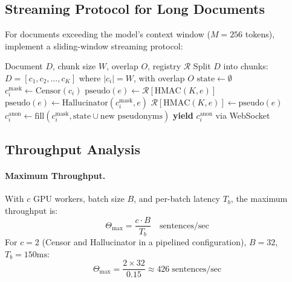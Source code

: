 \documentclass[11pt, a4paper]{article}
\begin{document}
\subsection{Streaming Protocol for Long Documents}

For documents exceeding the model's context window ($M = 256$ tokens), implement a sliding-window streaming protocol:

\begin{algorithm}[H]
\caption{Streaming Anonymization with Entity State Propagation}
\label{alg:streaming}
\begin{algorithmic}[1]
\Require Document $D$, chunk size $W$, overlap $O$, registry $\mathcal{R}$
\State Split $D$ into chunks: $D = [c_1, c_2, \ldots, c_K]$ where $|c_i| = W$, with overlap $O$
\State $\text{state} \leftarrow \emptyset$ 
    \State $c_i^{\text{mask}} \leftarrow \text{Censor}(c_i)$
            \State $\text{pseudo}(e) \leftarrow \mathcal{R}[\text{HMAC}(K, e)]$ 
        \Else
            \State $\text{pseudo}(e) \leftarrow \text{Hallucinator}(c_i^{\text{mask}}, e)$
            \State $\mathcal{R}[\text{HMAC}(K, e)] \leftarrow \text{pseudo}(e)$ 
        \EndIf
    \EndFor
    \State $c_i^{\text{anon}} \leftarrow \text{fill}(c_i^{\text{mask}}, \text{state} \cup \text{new pseudonyms})$
    \State \textbf{yield} $c_i^{\text{anon}}$ via WebSocket 
\EndFor
\end{algorithmic}
\end{algorithm}

\subsection{Throughput Analysis}

\paragraph{Maximum Throughput.}
With $c$ GPU workers, batch size $B$, and per-batch latency $T_b$, the maximum throughput is:
\begin{equation}
\Theta_{\max} = \frac{c \cdot B}{T_b} \quad \text{sentences/sec}
\end{equation}
For $c = 2$ (Censor and Hallucinator in a pipelined configuration), $B = 32$, $T_b = 150\text{ms}$:
\begin{equation}
\Theta_{\max} = \frac{2 \times 32}{0.15} \approx 426 \; \text{sentences/sec}
\end{equation}
\end{document}
